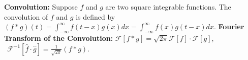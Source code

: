 {\bf Convolution:} Suppose $f$ and $g$ are two square integrable functions. The convolution of $f$ and $g$ is defined by \newline $(f*g)(t)=\int_{-\infty}^{\infty}f(t-x)g(x)dx=\int_{-\infty}^{\infty}f(x)g(t-x)dx$. 
{\bf Fourier Transform of the Convolution:} \newline$\mathcal{F}[f*g]=\sqrt{2\pi}\mathcal{F}[f]\cdot\mathcal{F}[g]$,   $~~\mathcal{F}^{-1}[\hat{f}\cdot\hat{g}]=\frac{1}{\sqrt{2\pi}}(f*g)$.